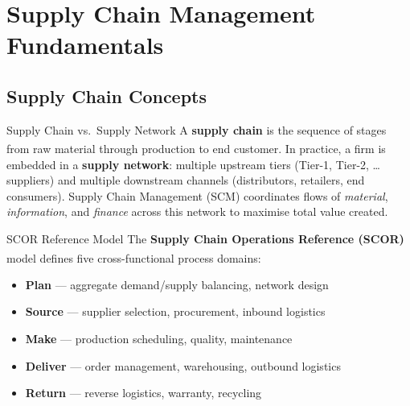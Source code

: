 \section{Supply Chain Management Fundamentals}

\subsection{Supply Chain Concepts}


\begin{v3topic}{Supply Chain vs.\ Supply Network}
    A \textbf{supply chain} is the sequence of stages from raw material through production to end customer\textsuperscript{\cite[][pp.~1--4]{chopraSupplyChainManagement2019}}.
    In practice, a firm is embedded in a \textbf{supply network}: multiple upstream tiers (Tier-1, Tier-2, \ldots suppliers) and multiple downstream channels (distributors, retailers, end consumers).
    Supply Chain Management (SCM) coordinates flows of \emph{material}, \emph{information}, and \emph{finance} across this network to maximise total value created.

\end{v3topic}
\begin{v3topic}{SCOR Reference Model}
    The \textbf{Supply Chain Operations Reference (SCOR)} model defines five cross-functional process domains\textsuperscript{\cite[][pp.~5--6]{chopraSupplyChainManagement2019}}:
    \begin{itemize}
        \item \textbf{Plan} --- aggregate demand/supply balancing, network design
        \item \textbf{Source} --- supplier selection, procurement, inbound logistics
        \item \textbf{Make} --- production scheduling, quality, maintenance
        \item \textbf{Deliver} --- order management, warehousing, outbound logistics
        \item \textbf{Return} --- reverse logistics, warranty, recycling
    \end{itemize}

\end{v3topic}
